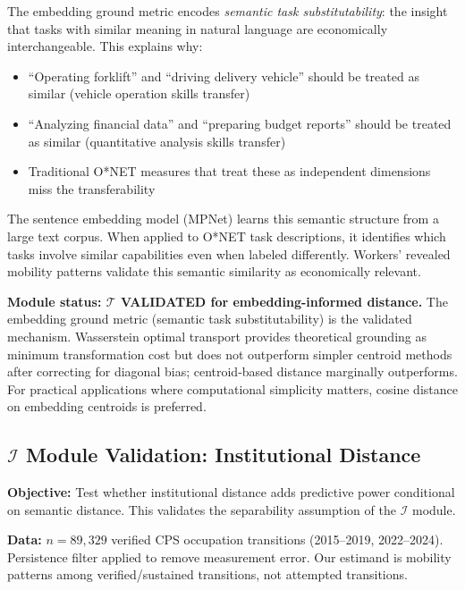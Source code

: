 \documentclass[12pt]{article}
\begin{document}
The embedding ground metric encodes \emph{semantic task substitutability}: the insight that tasks with similar meaning in natural language are economically interchangeable. This explains why:
\begin{itemize}
    \item ``Operating forklift'' and ``driving delivery vehicle'' should be treated as similar (vehicle operation skills transfer)
    \item ``Analyzing financial data'' and ``preparing budget reports'' should be treated as similar (quantitative analysis skills transfer)
    \item Traditional O*NET measures that treat these as independent dimensions miss the transferability
\end{itemize}

The sentence embedding model (MPNet) learns this semantic structure from a large text corpus. When applied to O*NET task descriptions, it identifies which tasks involve similar capabilities even when labeled differently. Workers' revealed mobility patterns validate this semantic similarity as economically relevant.


\textbf{Module status: $\mathcal{T}$ VALIDATED for embedding-informed distance.} The embedding ground metric (semantic task substitutability) is the validated mechanism. Wasserstein optimal transport provides theoretical grounding as minimum transformation cost but does not outperform simpler centroid methods after correcting for diagonal bias; centroid-based distance marginally outperforms. For practical applications where computational simplicity matters, cosine distance on embedding centroids is preferred.


\subsection{$\mathcal{I}$ Module Validation: Institutional Distance}
\label{subsec:cps-mobility}


\textbf{Objective:} Test whether institutional distance adds predictive power conditional on semantic distance. This validates the separability assumption of the $\mathcal{I}$ module.

\textbf{Data:} $n = 89{,}329$ verified CPS occupation transitions (2015--2019, 2022--2024). Persistence filter applied to remove measurement error. Our estimand is mobility patterns among verified/sustained transitions, not attempted transitions.
\end{document}
